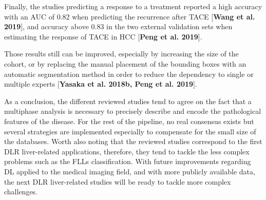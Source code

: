\documentclass[]{article}
\begin{document}
Finally, the studies predicting a response to a treatment reported a
high accuracy with an AUC of 0.82 when predicting the recurrence after
TACE {[}\textbf{Wang et al. 2019}{]}, and accuracy above 0.83 in the two
external validation sets when estimating the response of TACE in HCC
{[}\textbf{Peng et al. 2019}{]}.

Those results still can be improved, especially by increasing the size
of the cohort, or by replacing the manual placement of the bounding
boxes with an automatic segmentation method in order to reduce the
dependency to single or multiple experts {[}\textbf{Yasaka et al. 2018b,
Peng et al. 2019}{]}.

As a conclusion, the different reviewed studies tend to agree on the
fact that a multiphase analysis is necessary to precisely describe and
encode the pathological features of the disease. For the rest of the
pipeline, no real consensus exists but several strategies are
implemented especially to compensate for the small size of the
databases. Worth also noting that the reviewed studies correspond to the
first DLR liver-related applications, therefore, they tend to tackle the
less complex problems such as the FLLs classification. With future
improvements regarding DL applied to the medical imaging field, and with
more publicly available data, the next DLR liver-related studies will be
ready to tackle more complex challenges.

\newpage
	
	
\end{document}
